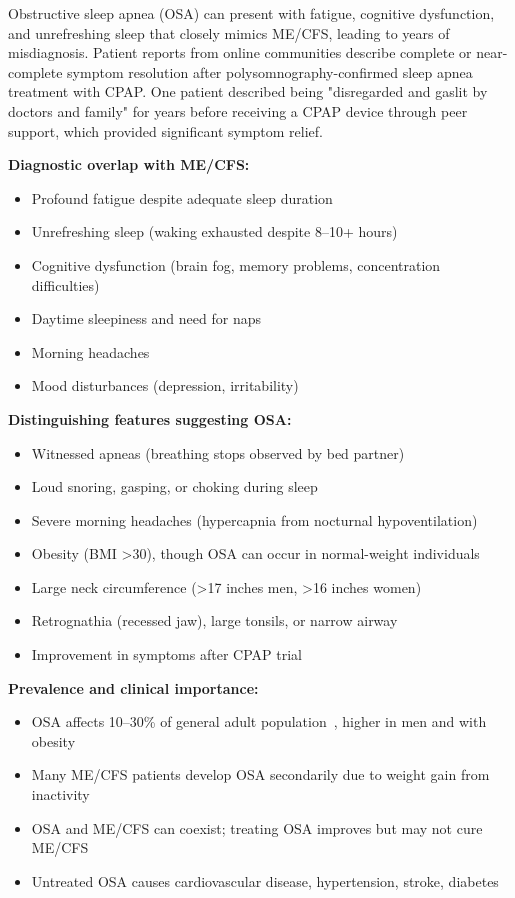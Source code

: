 \begin{observation}
\label{obs:sleep-apnea-misdiagnosis}
Obstructive sleep apnea (OSA) can present with fatigue, cognitive dysfunction, and unrefreshing sleep that closely mimics ME/CFS, leading to years of misdiagnosis. Patient reports from online communities describe complete or near-complete symptom resolution after polysomnography-confirmed sleep apnea treatment with CPAP. One patient described being "disregarded and gaslit by doctors and family" for years before receiving a CPAP device through peer support, which provided significant symptom relief.

\textbf{Diagnostic overlap with ME/CFS:}
\begin{itemize}
    \item Profound fatigue despite adequate sleep duration
    \item Unrefreshing sleep (waking exhausted despite 8--10+ hours)
    \item Cognitive dysfunction (brain fog, memory problems, concentration difficulties)
    \item Daytime sleepiness and need for naps
    \item Morning headaches
    \item Mood disturbances (depression, irritability)
\end{itemize}

\textbf{Distinguishing features suggesting OSA:}
\begin{itemize}
    \item Witnessed apneas (breathing stops observed by bed partner)
    \item Loud snoring, gasping, or choking during sleep
    \item Severe morning headaches (hypercapnia from nocturnal hypoventilation)
    \item Obesity (BMI >30), though OSA can occur in normal-weight individuals
    \item Large neck circumference (>17 inches men, >16 inches women)
    \item Retrognathia (recessed jaw), large tonsils, or narrow airway
    \item Improvement in symptoms after CPAP trial
\end{itemize}

\textbf{Prevalence and clinical importance:}
\begin{itemize}
    \item OSA affects 10--30\% of general adult population~\cite{Peppard2013OSAprevalence,Senaratna2017OSAmeta,Young2002OSAepidemiology}, higher in men and with obesity
    \item Many ME/CFS patients develop OSA secondarily due to weight gain from inactivity
    \item OSA and ME/CFS can coexist; treating OSA improves but may not cure ME/CFS
    \item Untreated OSA causes cardiovascular disease, hypertension, stroke, diabetes
\end{itemize}


\end{observation}
